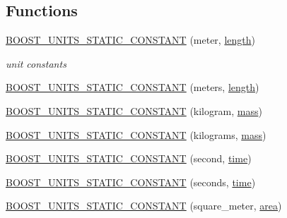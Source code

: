 \subsection*{Functions}
\begin{DoxyCompactItemize}
\item 
\hyperlink{namespaceboost_1_1units_1_1test_a631272090f5fe255e4eac046d72e07a2}{B\+O\+O\+S\+T\+\_\+\+U\+N\+I\+T\+S\+\_\+\+S\+T\+A\+T\+I\+C\+\_\+\+C\+O\+N\+S\+T\+A\+NT} (meter, \hyperlink{namespaceboost_1_1units_1_1test_abb80de321402f6f139e1a1b182ea4655}{length})
\begin{DoxyCompactList}\small\item\em unit constants \end{DoxyCompactList}\item 
\hyperlink{namespaceboost_1_1units_1_1test_a03223b7a477e1e69a9b529e36a1f3ce1}{B\+O\+O\+S\+T\+\_\+\+U\+N\+I\+T\+S\+\_\+\+S\+T\+A\+T\+I\+C\+\_\+\+C\+O\+N\+S\+T\+A\+NT} (meters, \hyperlink{namespaceboost_1_1units_1_1test_abb80de321402f6f139e1a1b182ea4655}{length})
\item 
\hyperlink{namespaceboost_1_1units_1_1test_a3abd42158a7ac9b010d7fc0350a802b3}{B\+O\+O\+S\+T\+\_\+\+U\+N\+I\+T\+S\+\_\+\+S\+T\+A\+T\+I\+C\+\_\+\+C\+O\+N\+S\+T\+A\+NT} (kilogram, \hyperlink{namespaceboost_1_1units_1_1test_ac20a8750e8cda0bf9f5ab0571dec9210}{mass})
\item 
\hyperlink{namespaceboost_1_1units_1_1test_ac238a8b4d4053f1a53849198e2aa76c2}{B\+O\+O\+S\+T\+\_\+\+U\+N\+I\+T\+S\+\_\+\+S\+T\+A\+T\+I\+C\+\_\+\+C\+O\+N\+S\+T\+A\+NT} (kilograms, \hyperlink{namespaceboost_1_1units_1_1test_ac20a8750e8cda0bf9f5ab0571dec9210}{mass})
\item 
\hyperlink{namespaceboost_1_1units_1_1test_aeac0aa2887fd0d7991a48b63df5b9cca}{B\+O\+O\+S\+T\+\_\+\+U\+N\+I\+T\+S\+\_\+\+S\+T\+A\+T\+I\+C\+\_\+\+C\+O\+N\+S\+T\+A\+NT} (second, \hyperlink{namespaceboost_1_1units_1_1test_aa6015c1af04d051a648ce2d7bb3a6876}{time})
\item 
\hyperlink{namespaceboost_1_1units_1_1test_af3c7b9ae11e08cea93e185c8728d8edc}{B\+O\+O\+S\+T\+\_\+\+U\+N\+I\+T\+S\+\_\+\+S\+T\+A\+T\+I\+C\+\_\+\+C\+O\+N\+S\+T\+A\+NT} (seconds, \hyperlink{namespaceboost_1_1units_1_1test_aa6015c1af04d051a648ce2d7bb3a6876}{time})
\item 
\hyperlink{namespaceboost_1_1units_1_1test_a8f158957e334f6ad3d2d27e41e507294}{B\+O\+O\+S\+T\+\_\+\+U\+N\+I\+T\+S\+\_\+\+S\+T\+A\+T\+I\+C\+\_\+\+C\+O\+N\+S\+T\+A\+NT} (square\+\_\+meter, \hyperlink{namespaceboost_1_1units_1_1test_aefe7b1b4d24a0c81afb2d61774143151}{area})

\end{DoxyCompactItemize}
